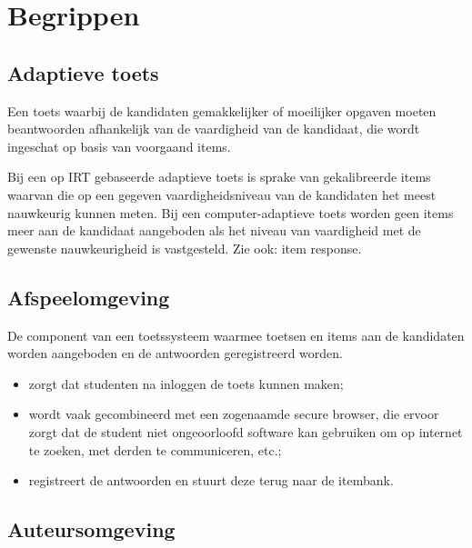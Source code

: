 \documentclass[
  letterpaper,
  DIV=11,
  numbers=noendperiod]{scrreprt}
\providecommand{\tightlist}{%
  \setlength{\itemsep}{0pt}\setlength{\parskip}{0pt}}\usepackage{longtable,booktabs,array}
\begin{document}

\hypertarget{begrippen}{%
\chapter{Begrippen}\label{begrippen}}

\hypertarget{adaptieve-toets}{%
\section{Adaptieve toets}\label{adaptieve-toets}}

Een toets waarbij de kandidaten gemakkelijker of moeilijker opgaven
moeten beantwoorden afhankelijk van de vaardigheid van de kandidaat, die
wordt ingeschat op basis van voorgaand items.

Bij een op IRT gebaseerde adaptieve toets is sprake van gekalibreerde
items waarvan die op een gegeven vaardigheidsniveau van de kandidaten
het meest nauwkeurig kunnen meten. Bij een computer-adaptieve toets
worden geen items meer aan de kandidaat aangeboden als het niveau van
vaardigheid met de gewenste nauwkeurigheid is vastgesteld. Zie ook: item
response.

\hypertarget{afspeelomgeving}{%
\section{Afspeelomgeving}\label{afspeelomgeving}}

De component van een toetssysteem waarmee toetsen en items aan de
kandidaten worden aangeboden en de antwoorden geregistreerd worden.

\begin{itemize}
\tightlist
\item
  zorgt dat studenten na inloggen de toets kunnen maken;
\item
  wordt vaak gecombineerd met een zogenaamde secure browser, die ervoor
  zorgt dat de student niet ongeoorloofd software kan gebruiken om op
  internet te zoeken, met derden te communiceren, etc.;
\item
  registreert de antwoorden en stuurt deze terug naar de itembank.
\end{itemize}

\hypertarget{auteursomgeving}{%
\section{Auteursomgeving}\label{auteursomgeving}}
\end{document}
